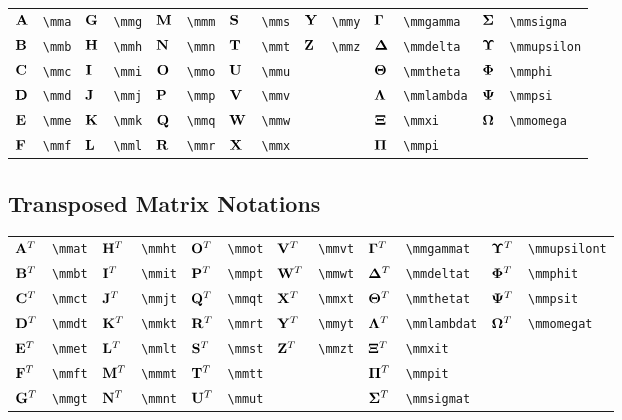 \documentclass{article}
\begin{document}
\begin{tabular}{*{14}{l}}
${\mathbf A}$ & \lstinline`\mma` & ${\mathbf G}$ & \lstinline`\mmg` & ${\mathbf M}$ & \lstinline`\mmm` & ${\mathbf S}$ & \lstinline`\mms` & ${\mathbf Y}$ & \lstinline`\mmy` & ${\bm \Gamma}$ & \lstinline`\mmgamma` & ${\bm \Sigma}$ & \lstinline`\mmsigma`\\
${\mathbf B}$ & \lstinline`\mmb` & ${\mathbf H}$ & \lstinline`\mmh` & ${\mathbf N}$ & \lstinline`\mmn` & ${\mathbf T}$ & \lstinline`\mmt` & ${\mathbf Z}$ & \lstinline`\mmz` & ${\bm \Delta}$ & \lstinline`\mmdelta` & ${\bm \Upsilon}$ & \lstinline`\mmupsilon`\\
${\mathbf C}$ & \lstinline`\mmc` & ${\mathbf I}$ & \lstinline`\mmi` & ${\mathbf O}$ & \lstinline`\mmo` & ${\mathbf U}$ & \lstinline`\mmu` &  &  & ${\bm \Theta}$ & \lstinline`\mmtheta` & ${\bm \Phi}$ & \lstinline`\mmphi`\\
${\mathbf D}$ & \lstinline`\mmd` & ${\mathbf J}$ & \lstinline`\mmj` & ${\mathbf P}$ & \lstinline`\mmp` & ${\mathbf V}$ & \lstinline`\mmv` &  &  & ${\bm \Lambda}$ & \lstinline`\mmlambda` & ${\bm \Psi}$ & \lstinline`\mmpsi`\\
${\mathbf E}$ & \lstinline`\mme` & ${\mathbf K}$ & \lstinline`\mmk` & ${\mathbf Q}$ & \lstinline`\mmq` & ${\mathbf W}$ & \lstinline`\mmw` &  &  & ${\bm \Xi}$ & \lstinline`\mmxi` & ${\bm \Omega}$ & \lstinline`\mmomega`\\
${\mathbf F}$ & \lstinline`\mmf` & ${\mathbf L}$ & \lstinline`\mml` & ${\mathbf R}$ & \lstinline`\mmr` & ${\mathbf X}$ & \lstinline`\mmx` &  &  & ${\bm \Pi}$ & \lstinline`\mmpi` & \\
\end{tabular}

\subsection{Transposed Matrix Notations}
\begin{tabular}{*{12}{l}}
${{\mathbf A}^T}$ & \lstinline`\mmat` & ${{\mathbf H}^T}$ & \lstinline`\mmht` & ${{\mathbf O}^T}$ & \lstinline`\mmot` & ${{\mathbf V}^T}$ & \lstinline`\mmvt` & ${{\bm \Gamma}^T}$ & \lstinline`\mmgammat` & ${{\bm \Upsilon}^T}$ & \lstinline`\mmupsilont`\\
${{\mathbf B}^T}$ & \lstinline`\mmbt` & ${{\mathbf I}^T}$ & \lstinline`\mmit` & ${{\mathbf P}^T}$ & \lstinline`\mmpt` & ${{\mathbf W}^T}$ & \lstinline`\mmwt` & ${{\bm \Delta}^T}$ & \lstinline`\mmdeltat` & ${{\bm \Phi}^T}$ & \lstinline`\mmphit`\\
${{\mathbf C}^T}$ & \lstinline`\mmct` & ${{\mathbf J}^T}$ & \lstinline`\mmjt` & ${{\mathbf Q}^T}$ & \lstinline`\mmqt` & ${{\mathbf X}^T}$ & \lstinline`\mmxt` & ${{\bm \Theta}^T}$ & \lstinline`\mmthetat` & ${{\bm \Psi}^T}$ & \lstinline`\mmpsit`\\
${{\mathbf D}^T}$ & \lstinline`\mmdt` & ${{\mathbf K}^T}$ & \lstinline`\mmkt` & ${{\mathbf R}^T}$ & \lstinline`\mmrt` & ${{\mathbf Y}^T}$ & \lstinline`\mmyt` & ${{\bm \Lambda}^T}$ & \lstinline`\mmlambdat` & ${{\bm \Omega}^T}$ & \lstinline`\mmomegat`\\
${{\mathbf E}^T}$ & \lstinline`\mmet` & ${{\mathbf L}^T}$ & \lstinline`\mmlt` & ${{\mathbf S}^T}$ & \lstinline`\mmst` & ${{\mathbf Z}^T}$ & \lstinline`\mmzt` & ${{\bm \Xi}^T}$ & \lstinline`\mmxit` & \\
${{\mathbf F}^T}$ & \lstinline`\mmft` & ${{\mathbf M}^T}$ & \lstinline`\mmmt` & ${{\mathbf T}^T}$ & \lstinline`\mmtt` &  &  & ${{\bm \Pi}^T}$ & \lstinline`\mmpit` & \\
${{\mathbf G}^T}$ & \lstinline`\mmgt` & ${{\mathbf N}^T}$ & \lstinline`\mmnt` & ${{\mathbf U}^T}$ & \lstinline`\mmut` &  &  & ${{\bm \Sigma}^T}$ & \lstinline`\mmsigmat` & \\
\end{tabular}
\end{document}
